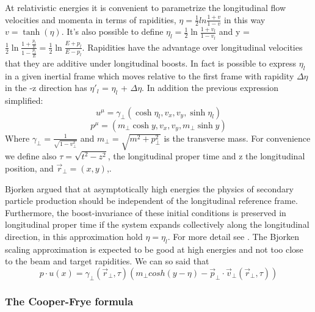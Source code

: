 \documentclass[12pt,a4paper]{book}
\begin{document}
	At relativistic energies it is convenient to parametrize the longitudinal flow velocities and momenta in terms of rapidities, $\eta= \frac{1}{2} ln \frac{1+v}{1-v}$ in this way $v = \tanh (\eta)$. It's also possible to define $\eta_l = \frac{1}{2} \ln \frac{1+v_l}{1-v_l}$ and y = $\frac{1}{2} \ln \frac{1+\frac{p_l}{E}}{1-\frac{p_l}{E}}= \frac{1}{2} \ln \frac{E+p_l}{E -p _l}$.  Rapidities have the advantage over longitudinal velocities that they are additive under longitudinal boosts. In fact is possible to express $\eta_l$ in a given inertial frame which moves relative to the first frame with rapidity $\Delta \eta$ in the -z direction has $\eta'_l$ = $\eta_l$ + $\Delta \eta$. In addition the previous expression simplified:
	\begin{equation}
		u^\mu=\gamma_\perp(\cosh \eta_l,v_x,v_y,\sinh \eta_l)
		\label{eq:4_velocity}
	\end{equation}
	\begin{equation}
		p^\mu=(m_\perp \cosh y,v_x,v_y, m_\perp \sinh y)
		\label{eq:4_momentum}
	\end{equation}
	Where $\gamma_\perp = \frac{1}{\sqrt{1-v_\perp^2}}$ and $m_\perp=\sqrt{m^2 + p_\perp^2}$ is the transverse mass. For convenience we define also $\tau=\sqrt{t^2-z^2}$, the longitudinal proper time and z the longitudinal position, and $\vec{r}_\perp=(x,y)$,.
	
	Bjorken argued that at asymptotically high energies the physics of secondary particle production should be independent of the longitudinal reference frame. Furthermore, the boost-invariance of these initial conditions is preserved in longitudinal proper time if the system expands collectively along the longitudinal direction, in this approximation hold $\eta=\eta_l$. For more detail see \cite{PhysRevD.27.140}. The Bjorken scaling approximation is expected to be good at high energies and not too close to the beam and target rapidities. We can so said that
	\begin{equation}
		p \cdot u(x) = \gamma_\perp(\vec{r}_\perp, \tau) \left(m_\perp cosh(y-\eta) - \vec{p}_\perp \cdot \vec{v}_\perp(\vec{r}_\perp, \tau) \right)
		\label{eq:p*u}
	\end{equation}
	
	\subsubsection{The Cooper-Frye formula}
	
\end{document}
